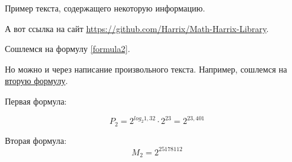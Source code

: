 \documentclass{article}
\begin{document}
 
Пример текста, содержащего некоторую информацию.
 
А вот ссылка на сайт \href{https://github.com/Harrix/Math-Harrix-Library}{https://github.com/Harrix/Math-Harrix-Library}.
 
Сошлемся на формулу \ref{formula2}.
 
Но можно и через написание произвольного текста. Например, сошлемся на \hyperref[formula2]{вторую формулу}.
 
Первая формула:
 
\begin{equation}\label{formula}
P_2 = 2^{log_2 1,32}\cdot 2^{23} = 2^{23,401}
\end{equation}
 
Вторая формула:
\begin{equation}\label{formula2}
M_2 = 2^{25178112}
\end{equation}
 
\end{document}
